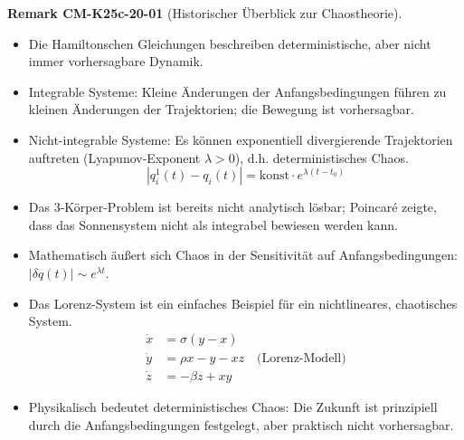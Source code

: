 \documentclass[10pt, letterpaper]{article}
\newcommand{\CustomHeading}[3]{%
  \par\medskip\noindent%
  \textbf{#1 #2} \textnormal{(#3)}.\enskip%
}
\newenvironment{REM}[2]{\CustomHeading{Remark}{#1}{#2}}{}
\begin{document}
\begin{REM}{CM-K25c-20-01}{Historischer Überblick zur Chaostheorie}
\begin{itemize}
  \item Die Hamiltonschen Gleichungen beschreiben deterministische, aber nicht immer vorhersagbare Dynamik.
  \item Integrable Systeme: Kleine Änderungen der Anfangsbedingungen führen zu kleinen Änderungen der Trajektorien; die Bewegung ist vorhersagbar.
  \item Nicht-integrable Systeme: Es können exponentiell divergierende Trajektorien auftreten (Lyapunov-Exponent $\lambda > 0$), d.h. deterministisches Chaos.
  \[|q^1_i(t) - q_i(t)| = \text{konst} \cdot e^{\lambda(t-t_0)}\]
  \item Das 3-Körper-Problem ist bereits nicht analytisch lösbar; Poincaré zeigte, dass das Sonnensystem nicht als integrabel bewiesen werden kann.
  \item Mathematisch äußert sich Chaos in der Sensitivität auf Anfangsbedingungen: $|\delta q(t)| \sim e^{\lambda t}$.
  \item Das Lorenz-System ist ein einfaches Beispiel für ein nichtlineares, chaotisches System.
  \begin{align*}
\dot{x} &= \sigma(y-x)\\
\dot{y} &= \rho x - y - xz \quad \text{(Lorenz-Modell)}\\
\dot{z} &= -\beta z + xy
\end{align*}
  \item Physikalisch bedeutet deterministisches Chaos: Die Zukunft ist prinzipiell durch die Anfangsbedingungen festgelegt, aber praktisch nicht vorhersagbar.
\end{itemize}
\end{REM}
\end{document}
